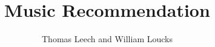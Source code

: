 \documentclass[11pt]{article}
\theoremstyle{plain}
\theoremstyle{definition}
\begin{document}
   	
   	\title{ Music Recommendation }
   	\author{ Thomas Leech and William Loucks }
   	\maketitle
   	
   	
   	
   	
   		
   
\end{document}
